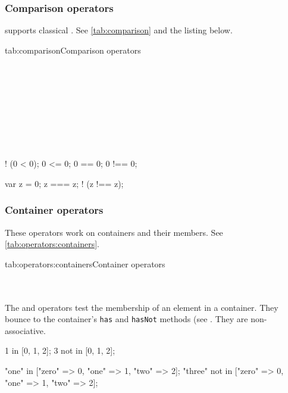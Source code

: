 \subsubsection{Comparison operators}
\label{sec:lang:operators:comparison}

\us supports classical . See
\autoref{tab:comparison} and the listing below.

\begin{operatorTable}{tab:comparison}{Comparison operators}
  \operatoreq\\
  \operatorneq\\
  \operatorpeq\\
  \operatorpneq\\
  \operatoraeq\\
  \operatoreqaeq\\
  \operatorinf\\
  \operatorinfeq\\
  \operatorsup\\
  \operatorsupeq
\end{operatorTable}

\begin{urbiassert}
 ! (0 < 0);
    0 <= 0;
    0 == 0;
   0 !== 0;

var z = 0;
     z === z;
  ! (z !== z);
\end{urbiassert}

\subsubsection{Container operators}
\label{sec:lang:operators:containers}

These operators work on containers and their members. See
\autoref{tab:operators:containers}.
\begin{operatorTable}{tab:operators:containers}{Container operators}
  \operatorin\\
  \operatornotin\\
  \hline
  \operatorsub\\
  \operatorsubass
\end{operatorTable}

The  and  operators test the membership of an element in
a container.  They bounce to the container's \lstinline|has| and
\lstinline|hasNot| methods (see .  They are
non-associative.

\begin{urbiassert}
1     in [0, 1, 2];
3 not in [0, 1, 2];

"one"   in     ["zero" => 0, "one" => 1, "two" => 2];
"three" not in ["zero" => 0, "one" => 1, "two" => 2];
\end{urbiassert}

